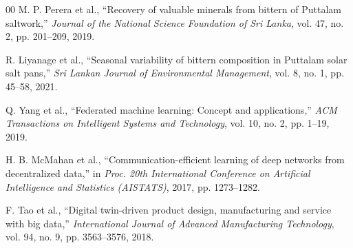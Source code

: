 \documentclass[conference]{IEEEtran}
\begin{document}
\begin{thebibliography}{00}
 M. P. Perera et al., ``Recovery of valuable minerals from bittern of Puttalam saltwork,'' \textit{Journal of the National Science Foundation of Sri Lanka}, vol. 47, no. 2, pp. 201–209, 2019.

 R. Liyanage et al., ``Seasonal variability of bittern composition in Puttalam solar salt pans,'' \textit{Sri Lankan Journal of Environmental Management}, vol. 8, no. 1, pp. 45–58, 2021.

 Q. Yang et al., ``Federated machine learning: Concept and applications,'' \textit{ACM Transactions on Intelligent Systems and Technology}, vol. 10, no. 2, pp. 1–19, 2019.

 H. B. McMahan et al., ``Communication-efficient learning of deep networks from decentralized data,'' in \textit{Proc. 20th International Conference on Artificial Intelligence and Statistics (AISTATS)}, 2017, pp. 1273–1282.

 F. Tao et al., ``Digital twin-driven product design, manufacturing and service with big data,'' \textit{International Journal of Advanced Manufacturing Technology}, vol. 94, no. 9, pp. 3563–3576, 2018.

\end{thebibliography}
\end{document}
